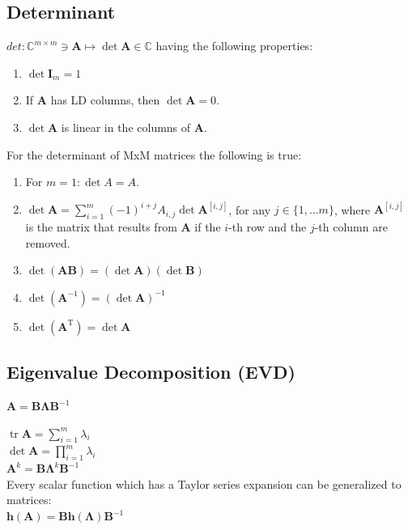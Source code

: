 \documentclass[english]{latex4ei/latex4ei_sheet}
\begin{document}
\begin{sectionbox}
  \subsection{Determinant}
  $det: \mathbb{C}^{m \times m} \ni \boldsymbol{A} \mapsto \operatorname{det} \boldsymbol{A} \in \mathbb{C}$ having the following properties:
  \begin{enumerate}
    \item $\operatorname{det} \mathbf{I}_{m}=1$
    \item If $\boldsymbol{A}$ has LD columns, then $\operatorname{det} \boldsymbol{A}=0$.
    \item $\operatorname{det} \boldsymbol{A}$ is linear in the columns of $\boldsymbol{A}$.
  \end{enumerate}


  For the determinant of MxM matrices the following is true:
  \begin{enumerate}
    \item For $m=1: \operatorname{det} A=A$.
    \item $\operatorname{det} \boldsymbol{A}=\sum_{i=1}^{m}(-1)^{i+j} A_{i, j} \operatorname{det} \boldsymbol{A}^{[i, j]}$, for any $j \in\{1, \ldots m\}$, where $\boldsymbol{A}^{[i, j]}$ is the matrix that results from $\boldsymbol{A}$ if the $i$-th row and the $j$-th column are removed.
    \item $\operatorname{det}(\boldsymbol{A} \boldsymbol{B})=(\operatorname{det} \boldsymbol{A})(\operatorname{det} \boldsymbol{B})$
    \item $\operatorname{det}\left(\boldsymbol{A}^{-1}\right)=(\operatorname{det} \boldsymbol{A})^{-1}$
    \item $\operatorname{det}\left(\boldsymbol{A}^{\mathrm{T}}\right)=\operatorname{det} \boldsymbol{A}$
  \end{enumerate}
\end{sectionbox}

\begin{sectionbox}
  \subsection{Eigenvalue Decomposition (EVD)}
  \begin{emphbox}
    $\boldsymbol{A}=\boldsymbol{B} \boldsymbol{\Lambda} \boldsymbol{B}^{-1}$
  \end{emphbox}
  $\operatorname{tr} \boldsymbol{A}=\sum_{i=1}^{m} \lambda_{i}$\\
  $\operatorname{det} \boldsymbol{A}=\prod_{i=1}^{m} \lambda_{i}$\\
  $\boldsymbol{A}^{k}=\boldsymbol{B} \boldsymbol{\Lambda}^{k} \boldsymbol{B}^{-1}$\\
  Every scalar function which has a Taylor series expansion can be generalized to matrices:\\
  $\boldsymbol{h}(\boldsymbol{A})=\boldsymbol{B} \boldsymbol{h}(\boldsymbol{\Lambda}) \boldsymbol{B}^{-1}$\\
\end{sectionbox}
\end{document}
